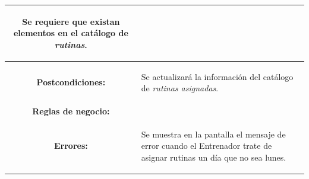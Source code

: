 \begin{table}[H]
\begin{tabular}{| c | p{12 cm} |}
							\begin{compactitem}
								\setlength\itemsep{-0.25em}
								\item Se requiere que existan elementos en el catálogo de \textit{rutinas}.
							\end{compactitem}\\
\hline
\textbf{Postcondiciones:} & \vspace{-2mm}	%
							\begin{compactitem}
								\item Se actualizará la información del catálogo de \textit{rutinas asignadas}.
							\end{compactitem}\\
\hline
\textbf{Reglas de negocio:} & \vspace{-2mm}	%
							\begin{compactitem}
								\item \nameref{rn:RND01}
								\item \nameref{rn:RNR18}
								\item \nameref{rn:RNR19}
								\item \nameref{rn:RNR20}
							\end{compactitem}\\
\hline
\textbf{Errores:} & \vspace{-2mm}	%
					\begin{compactitem}
						\setlength\itemsep{-0.25em}
						\item Se muestra en la pantalla \nameref{pant:IUE04.3} el mensaje de error \nameref{msj:MSG17} cuando el Entrenador trate de asignar rutinas un día que no sea lunes.
					\end{compactitem}\\
\hline
\end{tabular}
\end{table} 

\clearpage

